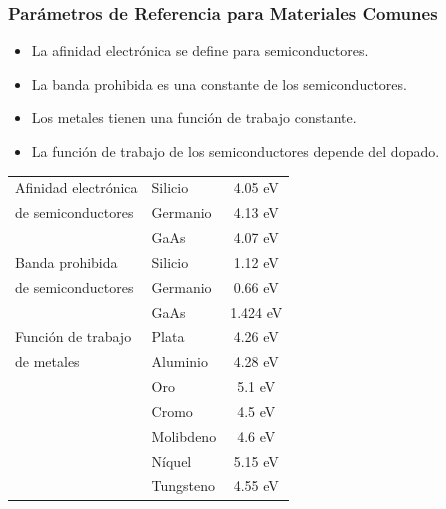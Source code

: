 \documentclass[10pt,t,aspectratio=169]{beamer}
\begin{document}
\begin{frame}[t]
    \frametitle{Parámetros de Referencia para Materiales Comunes}

    \begin{itemize}
        \item La afinidad electrónica se define para semiconductores.
        \item La banda prohibida es una constante de los semiconductores.
        \item Los metales tienen una función de trabajo constante.
        \item La función de trabajo de los semiconductores depende del dopado.        
    \end{itemize}

    \begin{table}[H]
        \centering\small
        \begin{tabular}{llc}
            \hline Afinidad electrónica & Silicio & 4.05 eV \\
            de semiconductores 	 & Germanio & 4.13 eV \\
	                             & GaAs		& 4.07 eV \\
            \hline Banda prohibida		 & Silicio	& 1.12 eV \\
            de semiconductores	 & Germanio & 0.66 eV \\
			                     & GaAs     & 1.424 eV \\
            \hline Función de trabajo   & Plata	& 4.26 eV \\
            de metales			 & Aluminio & 4.28 eV \\
				                 & Oro		& 5.1 eV \\
                                 & Cromo		& 4.5 eV \\
                                 & Molibdeno	& 4.6 eV \\
                                 & Níquel		& 5.15 eV \\
                                 & Tungsteno	& 4.55 eV \\
            \hline
        \end{tabular}
    \end{table}
\end{frame}
\end{document}
